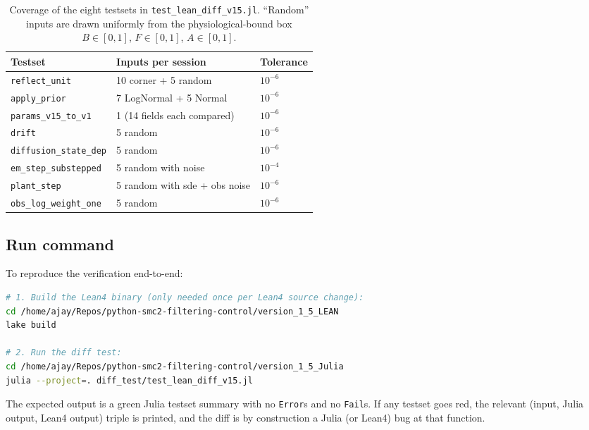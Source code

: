 \documentclass[11pt,a4paper]{article}
\begin{document}
\begin{table}[ht]
\centering
\small
\begin{tabular}{lll}
\toprule
Testset & Inputs per session & Tolerance \\
\midrule
\texttt{reflect\_unit}        & 10 corner + 5 random        & $10^{-6}$ \\
\texttt{apply\_prior}         & 7 LogNormal + 5 Normal      & $10^{-6}$ \\
\texttt{params\_v15\_to\_v1}  & 1 (14 fields each compared) & $10^{-6}$ \\
\texttt{drift}                & 5 random                    & $10^{-6}$ \\
\texttt{diffusion\_state\_dep}& 5 random                    & $10^{-6}$ \\
\texttt{em\_step\_substepped} & 5 random with noise         & $10^{-4}$ \\
\texttt{plant\_step}          & 5 random with sde + obs noise & $10^{-6}$ \\
\texttt{obs\_log\_weight\_one}& 5 random                    & $10^{-6}$ \\
\bottomrule
\end{tabular}
\caption{Coverage of the eight testsets in
\texttt{test\_lean\_diff\_v15.jl}. ``Random'' inputs are drawn uniformly
from the physiological-bound box $B \in [0,1]$, $F \in [0,1]$,
$A \in [0,1]$.}
\label{tab:diff_test_coverage}
\end{table}

\subsection{Run command}

To reproduce the verification end-to-end:

\begin{lstlisting}[language=bash]
# 1. Build the Lean4 binary (only needed once per Lean4 source change):
cd /home/ajay/Repos/python-smc2-filtering-control/version_1_5_LEAN
lake build

# 2. Run the diff test:
cd /home/ajay/Repos/python-smc2-filtering-control/version_1_5_Julia
julia --project=. diff_test/test_lean_diff_v15.jl
\end{lstlisting}

The expected output is a green Julia testset summary with no
\texttt{Error}s and no \texttt{Fail}s. If any testset goes red, the
relevant (input, Julia output, Lean4 output) triple is printed, and
the diff is by construction a Julia (or Lean4) bug at that function.
\end{document}
